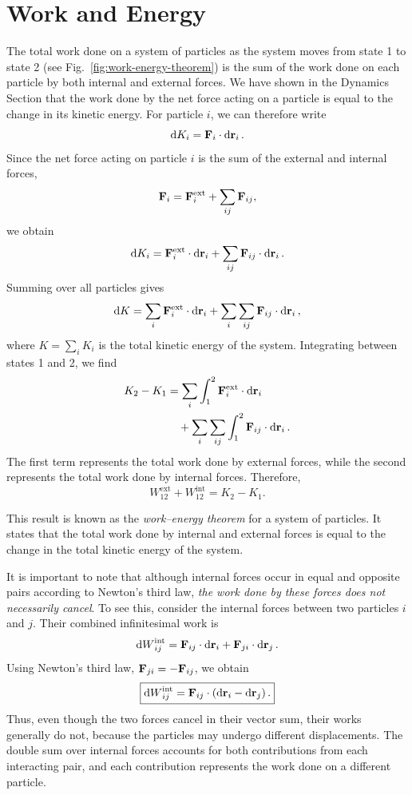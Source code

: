 \documentclass[12pt]{article}
\begin{document}
\section{Work and Energy}
The total work done on a system of particles as the system moves from state 1 to state 2 (see Fig.~\ref{fig:work-energy-theorem}) is the sum of the work done on each particle by both internal and external forces. We have shown in the Dynamics Section that the work done by the net force acting on a particle is equal to the change in its kinetic energy. For particle $i$, we can therefore write
\[
    \dd{K_i} = \vb{F}_i \cdot \dd{\vb{r}_i}.
\]
Since the net force acting on particle $i$ is the sum of the external and internal forces,
\[
    \vb{F}_i
    = \vb{F}_i^{\mathrm{ext}}
    + \sum_{ij}\vb{F}_{ij},
\]
we obtain
\[
    \dd{K_i}
    = \vb{F}_i^{\mathrm{ext}}\cdot\dd{\vb{r}_i}
    + \sum_{ij}\vb{F}_{ij}\cdot\dd{\vb{r}_i}.
\]
Summing over all particles gives
\[
    \dd{K}
    = \sum_i \vb{F}_i^{\mathrm{ext}}\cdot\dd{\vb{r}_i}
    + \sum_i\sum_{ij}
    \vb{F}_{ij}\cdot\dd{\vb{r}_i},
\]
where $K=\sum_i K_i$ is the total kinetic energy of the system. Integrating between states 1 and 2, we find
\begin{align}
    K_2-K_1
    &= \sum_i \int_1^2
    \vb{F}_i^{\mathrm{ext}}\cdot\dd{\vb{r}_i} \notag\\
    &\quad + \sum_i\sum_{ij}\int_1^2
    \vb{F}_{ij}\cdot\dd{\vb{r}_i}.
\end{align}
The first term represents the total work done by external forces, while the second represents the total work done by internal forces. Therefore,
\[
    \boxed{
    W_{12}^{\mathrm{ext}}+W_{12}^{\mathrm{int}}
    =K_2-K_1.
    }
\]

This result is known as the \emph{work--energy theorem} for a system of particles. It states that the total work done by internal and external forces is equal to the change in the total kinetic energy of the system.

It is important to note that although internal forces occur in equal and opposite pairs according to Newton's third law, \emph{the work done by these forces does not necessarily cancel}. To see this, consider the internal forces between two particles $i$ and $j$. Their combined infinitesimal work is
\[
    \dd{W}_{ij}^{\mathrm{int}}
    = \vb{F}_{ij}\cdot\dd{\vb{r}_i}
    + \vb{F}_{ji}\cdot\dd{\vb{r}_j}.
\]
Using Newton's third law, $\vb{F}_{ji}=-\vb{F}_{ij}$, we obtain
\[
    \boxed{
    \dd{W}_{ij}^{\mathrm{int}}
    = \vb{F}_{ij}\cdot
    \left(\dd{\vb{r}_i}-\dd{\vb{r}_j}\right).
    }
\]
Thus, even though the two forces cancel in their vector sum, their works generally do not, because the particles may undergo different displacements. The double sum over internal forces accounts for both contributions from each interacting pair, and each contribution represents the work done on a different particle.
\end{document}
